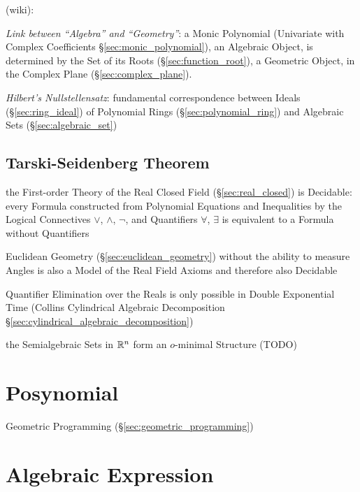 (wiki):

\emph{Link between ``Algebra'' and ``Geometry''}: a Monic Polynomial
(Univariate with Complex Coefficients \S\ref{sec:monic_polynomial}), an
Algebraic Object, is determined by the Set of its Roots
(\S\ref{sec:function_root}), a Geometric Object, in the Complex Plane
(\S\ref{sec:complex_plane}).

\emph{Hilbert's Nullstellensatz}: fundamental correspondence between Ideals
(\S\ref{sec:ring_ideal}) of Polynomial Rings (\S\ref{sec:polynomial_ring}) and
Algebraic Sets (\S\ref{sec:algebraic_set})



\subsection{Tarski-Seidenberg Theorem}\label{sec:tarski_seidenberg}

the First-order Theory of the Real Closed Field (\S\ref{sec:real_closed}) is
Decidable: every Formula constructed from Polynomial Equations and Inequalities
by the Logical Connectives $\vee$, $\wedge$, $\neg$, and Quantifiers $\forall$,
$\exists$ is equivalent to a Formula without Quantifiers

Euclidean Geometry (\S\ref{sec:euclidean_geometry}) without the ability to
measure Angles is also a Model of the Real Field Axioms and therefore also
Decidable

Quantifier Elimination over the Reals is only possible in Double Exponential
Time (Collins Cylindrical Algebraic Decomposition
\S\ref{sec:cylindrical_algebraic_decomposition})

the Semialgebraic Sets in $\mathbb{R}^n$ form an $o$-minimal Structure (TODO)



\section{Posynomial}\label{sec:posynomial}

Geometric Programming (\S\ref{sec:geometric_programming})



\section{Algebraic Expression}\label{sec:algebraic_expression}


